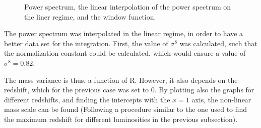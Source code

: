 \documentclass[12pt]{article}
\begin{document}
\begin{figure}[ht]
\begin{subfigure}[b]{0.49\textwidth}
	\end{subfigure}
	\caption{Power spectrum, the linear interpolation of the power spectrum on the liner regime, and the window function.}
	\label{fig:spectrums}
\end{figure}

The power spectrum was interpolated in the linear regime, in order to have a better data set for the integration. First, the value of $\sigma^{8}$ was calculated, such that the normalization constant could be calculated, which would ensure a value of $\sigma^{8} = 0.82$.

The mass variance is thus, a function of R. However, it also depends on the redshift, which for the previous case was set to 0. By plotting also the graphs for different redshifts, and finding the intercepts with the $x=1$ axis, the non-linear mass scale can be found (Following a procedure similar to the one used to find the maximum redshift for different luminosities in the previous subsection).
\end{document}
